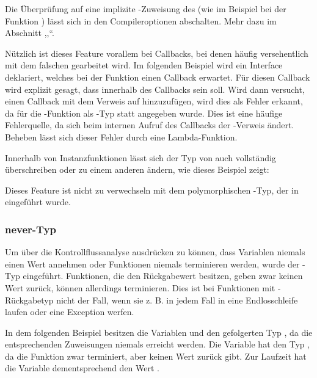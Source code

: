 
Die Überprüfung auf eine implizite \tsany-Zuweisung des \tsthis (wie im Beispiel bei der Funktion ) lässt sich in den Compileroptionen abschalten. Mehr dazu im Abschnitt ,,``.

Nützlich ist dieses Feature vorallem bei Callbacks, bei denen häufig versehentlich mit dem falschen \tsthis gearbeitet wird.
Im folgenden Beispiel wird ein Interface  deklariert, welches bei der Funktion  einen Callback erwartet. Für diesen Callback wird explizit gesagt, dass \tsthis innerhalb des Callbacks \tsvoid sein soll. Wird dann versucht, einen Callback mit dem Verweis auf  hinzuzufügen, wird dies als Fehler erkannt, da für die -Funktion als \tsthis-Typ statt \tsvoid {} angegeben wurde. Dies ist eine häufige Fehlerquelle, da sich beim internen Aufruf des Callbacks der \tsthis-Verweis ändert. Beheben lässt sich dieser Fehler durch eine Lambda-Funktion.


Innerhalb von Instanzfunktionen lässt sich der Typ von \tsthis auch vollständig überschreiben oder zu einem anderen ändern, wie dieses Beispiel zeigt:


Dieses Feature ist nicht zu verwechseln mit dem polymorphischen \tsthis-Typ, der in  eingeführt wurde.

\subsubsection{never-Typ}
Um über die Kontrollflussanalyse ausdrücken zu können, dass Variablen niemals einen Wert annehmen oder Funktionen niemals terminieren werden, wurde der \tsnever-Typ eingeführt. Funktionen, die den Rückgabewert \tsvoid besitzen, geben zwar keinen Wert zurück, können allerdings terminieren. Dies ist bei Funktionen mit \tsnever-Rückgabetyp nicht der Fall, wenn sie z. B. in jedem Fall in eine Endlosschleife laufen oder eine Exception werfen.

In dem folgenden Beispiel besitzen die Variablen  und  den gefolgerten Typ \tsnever, da die entsprechenden Zuweisungen niemals erreicht werden. Die Variable  hat den Typ \tsvoid, da die Funktion  zwar terminiert, aber keinen Wert zurück gibt. Zur Laufzeit hat die Variable  dementsprechend den Wert \tsundefined.

